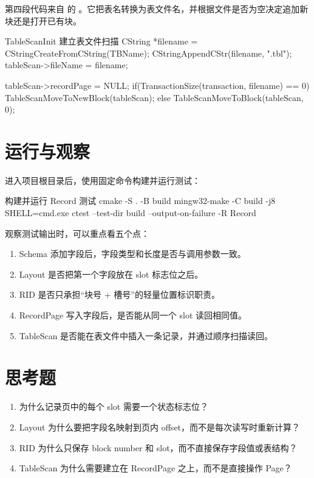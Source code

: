 第四段代码来自  的 。它把表名转换为表文件名，并根据文件是否为空决定追加新块还是打开已有块。

\begin{dbcode}{TableScanInit 建立表文件扫描}
CString *filename = CStringCreateFromCString(TBName);
CStringAppendCStr(filename, ".tbl");
tableScan->fileName = filename;

tableScan->recordPage = NULL;
if(TransactionSize(transaction, filename) == 0){
    TableScanMoveToNewBlock(tableScan);
}else{
    TableScanMoveToBlock(tableScan, 0);
}
\end{dbcode}

\section{运行与观察}
\label{sec:record-run}

进入项目根目录后，使用固定命令构建并运行测试：

\begin{dbcode}[listing options={language=bash}]{构建并运行 Record 测试}
cmake -S . -B build
mingw32-make -C build -j8 SHELL=cmd.exe
ctest --test-dir build --output-on-failure -R Record
\end{dbcode}

观察测试输出时，可以重点看五个点：

\begin{enumerate}
  \item Schema 添加字段后，字段类型和长度是否与调用参数一致。
  \item Layout 是否把第一个字段放在 slot 标志位之后。
  \item RID 是否只承担“块号 + 槽号”的轻量位置标识职责。
  \item RecordPage 写入字段后，是否能从同一个 slot 读回相同值。
  \item TableScan 是否能在表文件中插入一条记录，并通过顺序扫描读回。
\end{enumerate}

\section{思考题}
\label{sec:record-questions}

\begin{enumerate}
  \item 为什么记录页中的每个 slot 需要一个状态标志位？
  \item Layout 为什么要把字段名映射到页内 offset，而不是每次读写时重新计算？
  \item RID 为什么只保存 block number 和 slot，而不直接保存字段值或表结构？
  \item TableScan 为什么需要建立在 RecordPage 之上，而不是直接操作 Page？
\end{enumerate}
